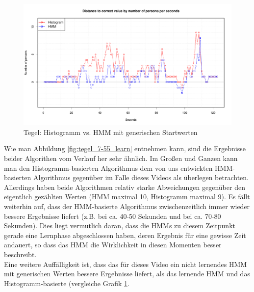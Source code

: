 \begin{figure}
	\centering
\includegraphics[width=1\textwidth]{bilder/safest_plot_tegel_7-55_hmm_nolearn.pdf}
	\caption{Tegel: Histogramm vs. HMM mit generischen Startwerten}
	\label{fig:tegel_7-55_nolearn}
\end{figure}
Wie man Abbildung \ref{fig:tegel_7-55_learn} entnehmen kann, sind die Ergebnisse beider Algorithen vom Verlauf her sehr ähnlich. Im Großen und Ganzen kann man den Histogramm-basierten Algorithmus dem von uns entwickten HMM-basierten Algorithmus gegenüber im Falle dieses Videos als überlegen betrachten.
Allerdings haben beide Algorithmen relativ starke Abweichungen gegenüber den eigentlich gezählten Werten (HMM maximal 10, Histogramm maximal 9).
Es fällt weiterhin auf, dass der HMM-basierte Algorithmus zwischenzeitlich immer wieder bessere Ergebnisse liefert (z.B. bei ca. 40-50 Sekunden und bei ca. 70-80 Sekunden).
Dies liegt vermutlich daran, dass die HMMs zu diesem Zeitpunkt gerade eine Lernphase abgeschlossen haben, deren Ergebnis für eine gewisse Zeit andauert, so dass das HMM die Wirklichkeit in diesen Momenten besser beschreibt.\\
Eine weitere Auffälligkeit ist, dass das für dieses Video ein nicht lernendes HMM mit generischen Werten bessere Ergebnisse liefert, als das lernende HMM und das Histogramm-basierte (vergleiche Grafik \ref{fig:tegel_7-55_nolearn}.

